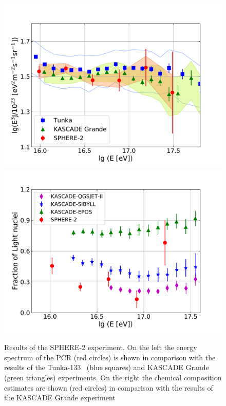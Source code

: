 \documentclass[a4paper,11pt]{article}
\begin{document}
\begin{figure}[t]
\centering %
\hfill
\includegraphics[height=.25\textheight]{sphere2spectrum.pdf}
\hfill
\includegraphics[height=.25\textheight]{sphere2composition.pdf}
\hfill
\caption{Results of the SPHERE-2 experiment. On the left the energy spectrum of the PCR (red circles) is shown in comparison with the results of the Tunka-133~\cite{Tunka2020} (blue squares) and KASCADE Grande~\cite{Ape12} (green triangles) experiments. On the right the chemical composition estimates are shown (red circles) in comparison with the results of the KASCADE Grande experiment~\cite{Ape13}}
\label{fig:Sphere_results}
\end{figure}
\end{document}

